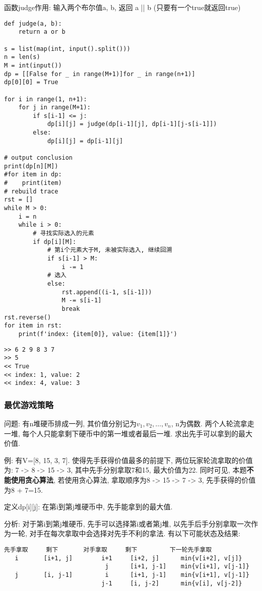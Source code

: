\documentclass[../main]{subfiles}
\begin{document}
\begin{sloppy}
函数judge作用: 输入两个布尔值a, b, 返回 a || b (只要有一个true就返回true)

\begin{lstlisting}[style = Python]
def judge(a, b):
    return a or b

s = list(map(int, input().split()))
n = len(s)
M = int(input())
dp = [[False for _ in range(M+1)]for _ in range(n+1)]
dp[0][0] = True

for i in range(1, n+1):
    for j in range(M+1):
        if s[i-1] <= j:
            dp[i][j] = judge(dp[i-1][j], dp[i-1][j-s[i-1]])
        else:
            dp[i][j] = dp[i-1][j]

# output conclusion
print(dp[n][M])
#for item in dp:
#    print(item)
# rebuild trace
rst = []
while M > 0:
    i = n
    while i > 0:
        # 寻找实际选入的元素
        if dp[i][M]:
            # 第i个元素大于M, 未被实际选入, 继续回溯
            if s[i-1] > M:
                i -= 1
            # 选入
            else:
                rst.append((i-1, s[i-1]))
                M -= s[i-1]
                break
rst.reverse()
for item in rst:
    print(f'index: {item[0]}, value: {item[1]}')
\end{lstlisting}

\begin{verbatim}
>> 6 2 9 8 3 7
>> 5
<< True
<< index: 1, value: 2
<< index: 4, value: 3
\end{verbatim}

\subsubsection{最优游戏策略}

问题: 有n堆硬币排成一列, 其价值分别记为$v_1, v_2, \dots, v_n$, n为偶数. 两个人轮流拿走一堆, 每个人只能拿剩下硬币中的第一堆或者最后一堆. 求出先手可以拿到的最大价值.

例: 有V=[8, 15, 3, 7]. 使得先手获得价值最多的前提下, 两位玩家轮流拿取的价值为: 7 -> 8 -> 15 -> 3, 其中先手分别拿取7和15, 最大价值为22. 同时可见, 本题\textbf{不能使用贪心算法}, 若使用贪心算法, 拿取顺序为8 -> 15 -> 7 -> 3, 先手获得的价值为8 + 7=15.

定义dp[i][j]: 在第i到第j堆硬币中, 先手能拿到的最大值.

分析: 对于第i到第j堆硬币, 先手可以选择第i或者第j堆, 以先手后手分别拿取一次作为一轮, 对手在每次拿取中会选择对先手不利的拿法. 有以下可能状态及结果:
\begin{verbatim}
先手拿取     剩下       对手拿取     剩下         下一轮先手拿取
   i       [i+1, j]        i+1     [i+2, j]      min{v[i+2], v[j]}
                            j      [i+1, j-1]    min{v[i+1], v[j-1]}
   j       [i, j-1]         i      [i+1, j-1]    min{v[i+1], v[j-1]}
                           j-1     [i, j-2]      min{v[i], v[j-2]}
\end{verbatim}


\end{sloppy}
\end{document}
